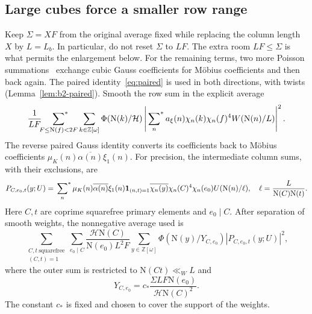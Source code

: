\documentclass[11pt]{article}
\numberwithin{equation}{section}
\newcommand{\OO}{\mathbb Z[\omega]}
\newcommand{\N}{\mathrm N}
\newcommand{\muk}{\mu_K}
\newcommand{\ind}{\mathbf1}
\newcommand{\ssum}{\sideset{}{^*}\sum}
\begin{document}
\subsection{Large cubes force a smaller row range}
Keep $\Sigma=XF$ from the original average fixed while replacing the
column length $X$ by $L=L_b$. In particular, do not reset $\Sigma$
to $LF$. The extra room $LF\le\Sigma$ is what permits the enlargement
below.
For the remaining terms, two more Poisson summations~\cite[Section~7]{OAI1112} exchange cubic
Gauss coefficients for M\"obius coefficients and then back again.
The paired identity~\eqref{eq:paired} is used in both directions, with
twists (Lemma~\ref{lem:b2-paired}).
Smooth the row sum in the explicit average
\begin{equation}\label{eq:d057}
 \frac1{LF}\ssum_{F\le\N(f)<2F}\sum_{k\in\OO}
 \Phi(\N(k)/\mathcal H)
 \left|\ssum_n a_\xi(n)\chi_n(k)\chi_n(f)^4W(\N(n)/L)\right|^2.
\end{equation}
The reverse paired Gauss identity converts its coefficients back to
M\"obius coefficients $\muk(n)\overline{\alpha(n)}\xi_1(n)$.
For precision, the intermediate column sums, with their exclusions, are
\begin{equation}\label{eq:P}
 P_{C,e_0,t}(y;U)=\ssum_n\muk(n)\overline{\alpha(n)}\xi_1(n)
 \ind_{(n,t)=1}\overline{\chi_n(y)}\chi_n(C)^4\chi_n(e_0)
 U(\N(n)/\ell),\quad \ell=\frac L{\N(C)\N(t)}.
\end{equation}
Here $C,t$ are coprime squarefree primary elements and $e_0\mid C$.
After separation of smooth weights, the nonnegative average used is
\begin{equation}\label{eq:Q}
 \sum_{\substack{C,t\ \mathrm{squarefree}\\(C,t)=1}}
 \sum_{e_0\mid C}\frac{\mathcal H\N(C)}{\N(e_0)L^2F}
 \sum_{y\in\OO}\Phi(\N(y)/Y_{C,e_0})
                       |P_{C,e_0,t}(y;U)|^2,
\end{equation}
where the outer sum is restricted to $\N(Ct)\ll_W L$ and
\begin{equation}\label{eq:d058}
 Y_{C,e_0}=c_*\frac{\Sigma LF\N(e_0)}{\mathcal H\N(C)^2}.
\end{equation}
The constant $c_*$ is fixed and chosen to cover the support of the weights.
\end{document}
